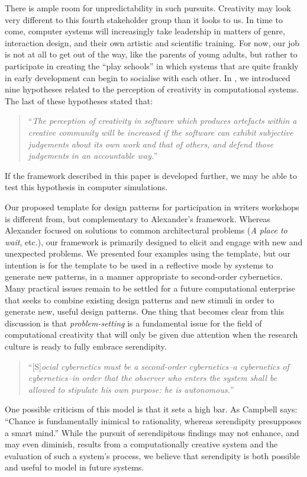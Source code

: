 There is ample room for unpredictability in such pursuits.  Creativity
may look very different to this fourth stakeholder group than it looks
to us.  In time to come, computer systems will increasingly take
leadership in matters of genre, interaction design, and their own
artistic and scientific training.  For now, our job is not at all to
get out of the way, like the parents of young adults, but rather to
participate in creating the ``play schools'' in which systems that are
quite frankly in early development can begin to socialise with each
other.
%
In \cite{stakeholder-groups-bookchapter}, we introduced nine
hypotheses related to the perception of creativity in computational
systems. 
The last of these hypotheses stated that:
\begin{quote}
``\emph{The perception of creativity in software which produces
  artefacts within a creative community will be increased if the
  software can exhibit subjective judgements about its own work and
  that of others, and defend those judgements in an accountable
  way.}''~\cite{stakeholder-groups-bookchapter}
\end{quote}
If the framework described in this paper is developed further, we may
be able to test this hypothesis in computer simulations.

Our proposed template for design patterns for participation in writers
workshops is different from, but complementary to Alexander's
framework.  Whereas Alexander focused on solutions to common
architectural problems (\emph{A place to wait}, etc.), our framework
is primarily designed to elicit and engage with new and unexpected
problems.  We presented four examples using the template, but our
intention is for the template to be used in a reflective mode by
systems to generate new patterns, in a manner appropriate to
second-order cybernetics.  Many practical issues remain to be settled
for a future computational enterprise that seeks to combine existing
design patterns and new stimuli in order to generate new, useful
design patterns.  One thing that becomes clear from this discussion is
that \emph{problem-setting} is a fundamental issue for the field of
computational creativity that will only be given due attention when
the research culture is ready to fully embrace serendipity.

\begin{quote}
``[S]\emph{ocial cybernetics must be a second-order cybernetics--a
    cybernetics of cybernetics--in order that the observer who enters
    the system shall be allowed to stipulate his own purpose: he is
    autonomous.}'' \cite[p. 286]{von2003essays}
\end{quote}

One possible criticism of this model is that it sets a high bar. As
Campbell \citeyear{campbell} says: ``Chance is fundamentally inimical
to rationality, whereas serendipity presupposes a smart mind.''  While
the pursuit of serendipitous findings may not enhance, and may even
diminish, results from a computationally creative system and the
evaluation of such a system's process, we believe that serendipity is
both possible and useful to model in future systems.
